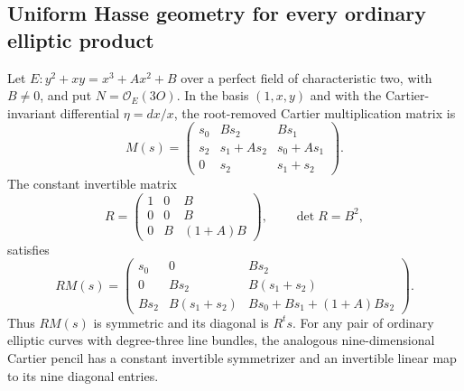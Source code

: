 \subsection{Uniform Hasse geometry for every ordinary elliptic product}
\label{subsec:ordinary-products-general-structure}

\begin{lemma}
\label{lem:ordinary-elliptic-universal-symmetrizer}
Let $E:y^2+xy=x^3+A x^2+B$ over a perfect field of characteristic
two, with $B\ne0$, and put $N=\mathcal O_E(3O)$.
In the basis $(1,x,y)$ and with the Cartier-invariant differential
$\eta=dx/x$, the root-removed Cartier multiplication matrix is
\[
 M(s)=\begin{pmatrix}
 s_0&B s_2&B s_1\\
 s_2&s_1+A s_2&s_0+A s_1\\
 0&s_2&s_1+s_2
 \end{pmatrix}.
\]
The constant invertible matrix
\[
 R=\begin{pmatrix}1&0&B\\0&0&B\\0&B&(1+A)B\end{pmatrix},
 \qquad\det R=B^2,
\]
satisfies
\[
 RM(s)=\begin{pmatrix}
 s_0&0&B s_2\\
 0&B s_2&B(s_1+s_2)\\
 B s_2&B(s_1+s_2)&B s_0+B s_1+(1+A)B s_2
 \end{pmatrix}.
\]
Thus $RM(s)$ is symmetric and its diagonal is $R^t s$.
For any pair of ordinary elliptic curves with degree-three
line bundles, the analogous nine-dimensional Cartier pencil
has a constant invertible symmetrizer and an invertible
linear map to its nine diagonal entries.
\end{lemma}

